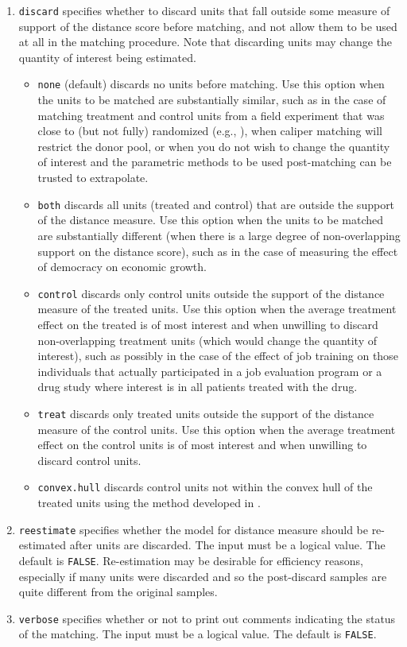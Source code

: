 \documentclass[oneside,letterpaper,titlepage]{article}
\begin{document}
\begin{enumerate}
\item \texttt{discard} specifies whether to discard units that fall
  outside some measure of support of the distance score before
  matching, and not allow them to be used at all in the matching
  procedure.  Note that discarding units may change the quantity of
  interest being estimated.
  \begin{itemize}
  \item \texttt{none} (default) discards no units before matching.
    Use this option when the units to be matched are substantially
    similar, such as in the case of matching treatment and control
    units from a field experiment that was close to (but not fully)
    randomized (e.g., \citealt{Imai05}), when caliper matching will
    restrict the donor pool, or when you do not wish to change the
    quantity of interest and the parametric methods to be used
    post-matching can be trusted to extrapolate.
  \item \texttt{both} discards all units (treated and control) that
    are outside the support of the distance measure. Use this option
    when the units to be matched are substantially different (when
    there is a large degree of non-overlapping support on the distance
    score), such as in the case of measuring the effect of democracy
    on economic growth.
  \item \texttt{control} discards only control units outside the
    support of the distance measure of the treated units.  Use this
    option when the average treatment effect on the treated is of most
    interest and when unwilling to discard non-overlapping treatment
    units (which would change the quantity of interest), such as
    possibly in the case of the effect of job training on those
    individuals that actually participated in a job evaluation program
    or a drug study where interest is in all patients treated with the
    drug.
  \item \texttt{treat} discards only treated units outside the support
    of the distance measure of the control units.  Use this option
    when the average treatment effect on the control units is of most
    interest and when unwilling to discard control units.
  \item \texttt{convex.hull} discards control units not within the
    convex hull of the treated units using the method developed in
    \citep{KinZen04}.
  \end{itemize}
  
\item \texttt{reestimate} specifies whether the model for distance
  measure should be re-estimated after units are discarded. The input
  must be a logical value. The default is \texttt{FALSE}.
  Re-estimation may be desirable for efficiency reasons, especially if
  many units were discarded and so the post-discard samples are quite
  different from the original samples.

\item \texttt{verbose} specifies whether or not to print out comments
  indicating the status of the matching. The input must be a logical
  value. The default is \texttt{FALSE}.
\end{enumerate}
\end{document}
